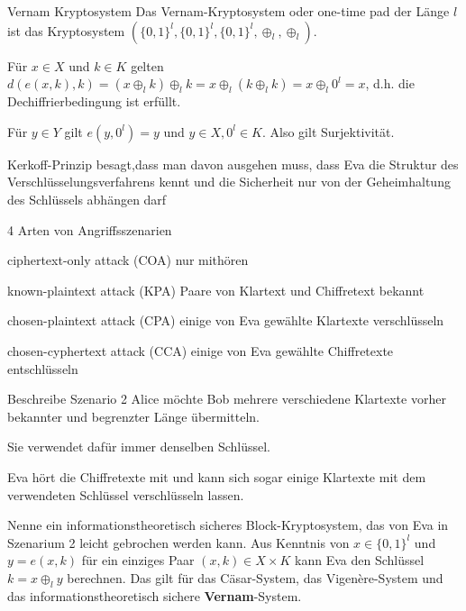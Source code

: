 \documentclass[avery5371, frame]{flashcards}
\begin{document}
\begin{flashcard}[Definition]{Vernam Kryptosystem}
    Das Vernam-Kryptosystem oder one-time pad der Länge $l$ ist das Kryptosystem $(\{0,1\}^l,\{0,1\}^l,\{0,1\}^l,\oplus_l,\oplus_l)$.
    \begin{enumerate*}
        \item Für $x\in X$ und $k\in K$ gelten $d(e(x,k),k)=(x\oplus_l k)\oplus_l k=x\oplus_l(k\oplus_l k) =x\oplus_l 0^l=x$, d.h. die Dechiffrierbedingung ist erfüllt.
        \item Für $y\in Y$ gilt $e(y,0^l) =y$ und $y\in X,0^l\in K$. Also gilt Surjektivität.
    \end{enumerate*}
\end{flashcard}

\begin{flashcard}[Kryptosysteme]{Kerkoff-Prinzip}
    besagt,dass man davon ausgehen muss, dass Eva die Struktur des Verschlüsselungsverfahrens kennt und die Sicherheit nur von der Geheimhaltung des Schlüssels abhängen darf
\end{flashcard}

\begin{flashcard}[Angriffe]{4 Arten von Angriffsszenarien}
    \begin{description*}
        \item[ciphertext-only attack] (COA) nur mithören
        \item[known-plaintext attack] (KPA) Paare von Klartext und Chiffretext bekannt
        \item[chosen-plaintext attack] (CPA) einige von Eva gewählte Klartexte verschlüsseln
        \item[chosen-cyphertext attack] (CCA) einige von Eva gewählte Chiffretexte entschlüsseln
    \end{description*}
\end{flashcard}

\begin{flashcard}{Beschreibe Szenario 2}
    Alice möchte Bob mehrere verschiedene Klartexte vorher bekannter und begrenzter Länge übermitteln.

    Sie verwendet dafür immer denselben Schlüssel.

    Eva hört die Chiffretexte mit und kann sich sogar einige Klartexte mit dem verwendeten Schlüssel verschlüsseln lassen.
\end{flashcard}

\begin{flashcard}{Nenne ein informationstheoretisch sicheres Block-Kryptosystem, das von Eva in Szenarium 2 leicht gebrochen werden kann.}
    Aus Kenntnis von $x\in\{0,1\}^l$ und $y=e(x,k)$ für ein einziges Paar $(x,k)\in X\times K$ kann Eva den Schlüssel $k=x\oplus_l y$ berechnen. Das gilt für das Cäsar-System, das Vigenère-System und das informationstheoretisch sichere \textbf{Vernam}-System.
\end{flashcard}
\end{document}

